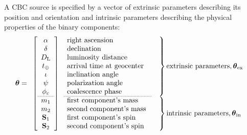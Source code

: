 \documentclass{iopart}
\begin{document}
A \ac{CBC} source is specified by a vector of extrinsic parameters describing its position and orientation and intrinsic parameters describing the physical properties of the binary components:
%
\begin{equation}
    \boldsymbol\theta = \begin{array}{l@{}l}
            \left[
            \begin{array}{c}
                \alpha \\
                \delta \\
                D_\mathrm{L} \\
                t_\oplus \\
                \iota \\
                \psi \\
                \phi_c \\
                \hdashline[1pt/1pt]
                m_1 \\
                m_2 \\
                \mathbf S_1 \\
                \mathbf S_2
            \end{array}
            \right] &
            \begin{array}{l}
                \left.
                \begin{array}{p{4cm}}
                    right ascension \\
                    declination \\
                    luminosity distance \\
                    arrival time at geocenter \\
                    inclination angle \\
                    polarization angle \\
                    coalescence phase \\
                    \hdashline[1pt/1pt]
                \end{array}
                \quad \right\} \textnormal{extrinsic parameters}, \boldsymbol\theta_\mathrm{ex} \\
                \left.
                \begin{array}{p{4cm}}
                    first component's mass \\
                    second component's mass \\
                    first component's spin \\
                    second component's spin
                \end{array}
                \quad \right\} \textnormal{intrinsic parameters}, \boldsymbol\theta_\mathrm{in}
            \end{array}
        \end{array}
\end{equation}
\end{document}
